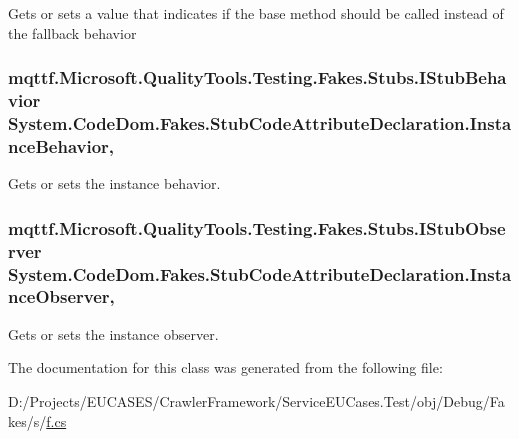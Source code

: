 Gets or sets a value that indicates if the base method should be called instead of the fallback behavior

\hypertarget{class_system_1_1_code_dom_1_1_fakes_1_1_stub_code_attribute_declaration_a360701c5367e704352eac0dd2fe69af7}{
\subsubsection[{Instance\-Behavior}]{\setlength{\rightskip}{0pt plus 5cm}mqttf.\-Microsoft.\-Quality\-Tools.\-Testing.\-Fakes.\-Stubs.\-I\-Stub\-Behavior System.\-Code\-Dom.\-Fakes.\-Stub\-Code\-Attribute\-Declaration.\-Instance\-Behavior\hspace{0.3cm}{\ttfamily [get]}, {\ttfamily [set]}}}\label{class_system_1_1_code_dom_1_1_fakes_1_1_stub_code_attribute_declaration_a360701c5367e704352eac0dd2fe69af7}


Gets or sets the instance behavior.

\hypertarget{class_system_1_1_code_dom_1_1_fakes_1_1_stub_code_attribute_declaration_a7b8b4e89b38ea69dc32476f5ee383563}{
\subsubsection[{Instance\-Observer}]{\setlength{\rightskip}{0pt plus 5cm}mqttf.\-Microsoft.\-Quality\-Tools.\-Testing.\-Fakes.\-Stubs.\-I\-Stub\-Observer System.\-Code\-Dom.\-Fakes.\-Stub\-Code\-Attribute\-Declaration.\-Instance\-Observer\hspace{0.3cm}{\ttfamily [get]}, {\ttfamily [set]}}}\label{class_system_1_1_code_dom_1_1_fakes_1_1_stub_code_attribute_declaration_a7b8b4e89b38ea69dc32476f5ee383563}


Gets or sets the instance observer.



The documentation for this class was generated from the following file\-:\begin{DoxyCompactItemize}
\item 
D\-:/\-Projects/\-E\-U\-C\-A\-S\-E\-S/\-Crawler\-Framework/\-Service\-E\-U\-Cases.\-Test/obj/\-Debug/\-Fakes/s/\hyperlink{s_2f_8cs}{f.\-cs}\end{DoxyCompactItemize}
